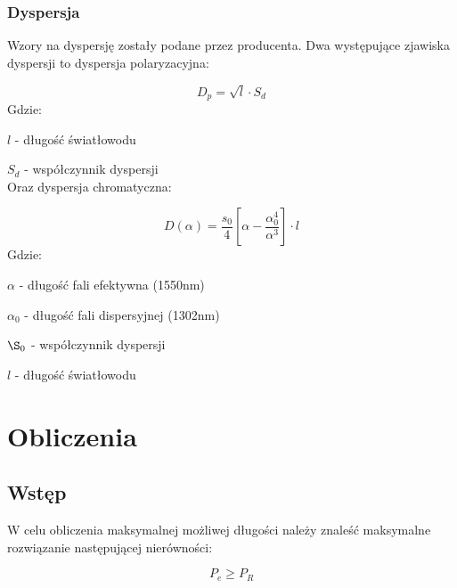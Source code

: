 \documentclass[paper=a4, fontsize=11pt]{scrartcl} %
\numberwithin{equation}{section} %
\numberwithin{figure}{section} %
\numberwithin{table}{section} %
\begin{document}
\subsubsection{Dyspersja}

Wzory na dyspersję zostały podane przez producenta.
Dwa występujące zjawiska dyspersji to dyspersja polaryzacyjna:

\begin{equation}
  D_p = \sqrt{l} \cdot S_d
\end{equation}
Gdzie:\\
\par \setlength\parindent{24pt}
\(l\) - długość światłowodu\\
\par \setlength\parindent{24pt}
\(S_d\) - współczynnik dyspersji\\

Oraz dyspersja chromatyczna:

\begin{equation}
  D(\alpha)=\frac{s_0}{4}[\alpha-\frac{\alpha_0^4}{\alpha^3}] \cdot l
\end{equation}
Gdzie:\\
\par \setlength\parindent{24pt}
\(\alpha\) - długość fali efektywna (1550nm)\\
\par \setlength\parindent{24pt}
\(\alpha_0\) - długość fali dispersyjnej (1302nm) \\
\par \setlength\parindent{24pt}
\(\S_0\) - współczynnik dyspersji \\
\par \setlength\parindent{24pt}
\(l\) - długość światłowodu\\


\section{Obliczenia}

\subsection { Wstęp }

W celu obliczenia maksymalnej możliwej długości należy znaleść maksymalne rozwiązanie następującej nierówności:

\begin{equation} \label{eq:problem} 
  P_e \ge P_R 
\end{equation}
\end{document}
